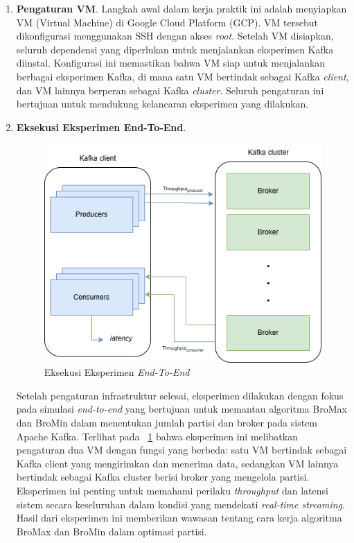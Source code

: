 \begin{enumerate}

	\item \textbf{Pengaturan VM}. Langkah awal dalam kerja praktik ini adalah menyiapkan VM (Virtual Machine) di Google Cloud Platform (GCP). VM tersebut dikonfigurasi menggunakan SSH dengan akses \textit{root}. Setelah VM disiapkan, seluruh dependensi yang diperlukan untuk menjalankan eksperimen Kafka diinstal. Konfigurasi ini memastikan bahwa VM siap untuk menjalankan berbagai eksperimen Kafka, di mana satu VM bertindak sebagai Kafka \textit{client}, dan VM lainnya berperan sebagai Kafka \textit{cluster}. Seluruh pengaturan ini bertujuan untuk mendukung kelancaran eksperimen yang dilakukan.

	\item \textbf{Eksekusi Eksperimen End-To-End}.
	
	\begin{figure}
		\centering
		\includegraphics[width=1\textwidth]
		{assets/pics/end-to-end-experiment.png}
		\caption{Eksekusi Eksperimen \textit{End-To-End}}
		\label{fig:end-to-end-experiment}
	\end{figure}
	
	Setelah pengaturan infrastruktur selesai, eksperimen dilakukan dengan fokus pada simulasi \textit{end-to-end} yang bertujuan untuk memantau algoritma BroMax dan BroMin dalam menentukan jumlah partisi dan broker pada sistem Apache Kafka. Terlihat pada \pic~\ref{fig:end-to-end-experiment} bahwa eksperimen ini melibatkan pengaturan dua VM dengan fungsi yang berbeda: satu VM bertindak sebagai Kafka client yang mengirimkan dan menerima data, sedangkan VM lainnya bertindak sebagai Kafka cluster berisi broker yang mengelola partisi. Eksperimen ini penting untuk memahami perilaku \textit{throughput} dan latensi sistem secara keseluruhan dalam kondisi yang mendekati \textit{real-time streaming}. Hasil dari eksperimen ini memberikan wawasan tentang cara kerja algoritma BroMax dan BroMin dalam optimasi partisi.


\end{enumerate}
